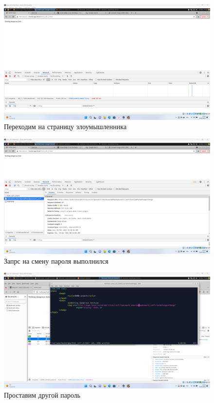 \documentclass[a4paper]{article}
\begin{document}
  \begin{figure}[H]
    \centering
    \includegraphics[width=\textwidth]{Screenshot_99}
    \caption{Переходим на страницу злоумышленника}
  \end{figure}

  \begin{figure}[H]
    \centering
    \includegraphics[width=\textwidth]{Screenshot_100}
    \caption{Запрс на смену пароля выполнился}
  \end{figure}

  \begin{figure}[H]
    \centering
    \includegraphics[width=\textwidth]{Screenshot_101}
    \caption{Проставим другой пароль}
  \end{figure}
\end{document}
